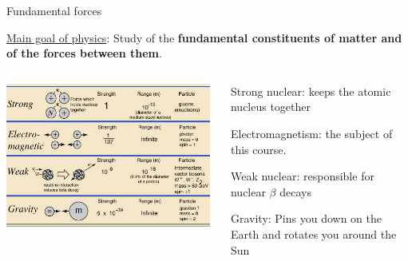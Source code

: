 \begin{frame}{Fundamental forces}

\underline{Main goal of physics}:
Study of the {\bf fundamental constituents of matter and of the forces between them}.\\
\vspace{0.2cm}

\begin{columns}
  \begin{column}{0.60\textwidth}
   \begin{center}
     \includegraphics[width=0.98\textwidth]{./images/schematics/fundamental_forces.png}\\
   \end{center}
  \end{column}
  \begin{column}{0.40\textwidth}
    \begin{itemize}
    {\small
      \item Strong nuclear: keeps the atomic nucleus together
      \item {\color{magenta}Electromagnetism: the subject of this course.}
      \item Weak nuclear: responsible for nuclear $\beta$ decays
      \item Gravity: Pins you down on the Earth and rotates you around the Sun
    }
    \end{itemize}
  \end{column}
\end{columns}

\end{frame}

%
%
%

